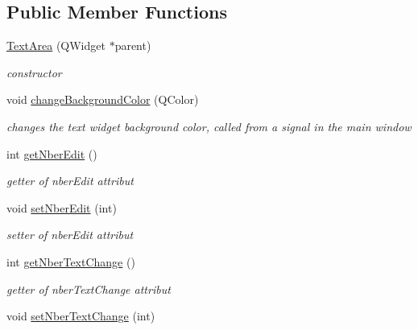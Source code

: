 \subsection*{Public Member Functions}
\begin{DoxyCompactItemize}
\item 
\hyperlink{classTextArea_a1e6e009ccaa04030d35f9187a37fe4da}{Text\+Area} (Q\+Widget $\ast$parent)
\begin{DoxyCompactList}\small\item\em constructor \end{DoxyCompactList}\item 
\hypertarget{classTextArea_acdfa220612113b805f8653dce6b7624e}{void \hyperlink{classTextArea_acdfa220612113b805f8653dce6b7624e}{change\+Background\+Color} (Q\+Color)}\label{classTextArea_acdfa220612113b805f8653dce6b7624e}

\begin{DoxyCompactList}\small\item\em changes the text widget background color, called from a signal in the main window \end{DoxyCompactList}\item 
\hypertarget{classTextArea_aee9835eedd5ed5d3b300782c653df555}{int \hyperlink{classTextArea_aee9835eedd5ed5d3b300782c653df555}{get\+Nber\+Edit} ()}\label{classTextArea_aee9835eedd5ed5d3b300782c653df555}

\begin{DoxyCompactList}\small\item\em getter of nber\+Edit attribut \end{DoxyCompactList}\item 
\hypertarget{classTextArea_a270d2c68600feb85df1ea6df7f9cf0fd}{void \hyperlink{classTextArea_a270d2c68600feb85df1ea6df7f9cf0fd}{set\+Nber\+Edit} (int)}\label{classTextArea_a270d2c68600feb85df1ea6df7f9cf0fd}

\begin{DoxyCompactList}\small\item\em setter of nber\+Edit attribut \end{DoxyCompactList}\item 
\hypertarget{classTextArea_a57737695ffd198e2c67d18b373ee56bb}{int \hyperlink{classTextArea_a57737695ffd198e2c67d18b373ee56bb}{get\+Nber\+Text\+Change} ()}\label{classTextArea_a57737695ffd198e2c67d18b373ee56bb}

\begin{DoxyCompactList}\small\item\em getter of nber\+Text\+Change attribut \end{DoxyCompactList}\item 
\hypertarget{classTextArea_ab1fb22beccd6bab80418252c04c741aa}{void \hyperlink{classTextArea_ab1fb22beccd6bab80418252c04c741aa}{set\+Nber\+Text\+Change} (int)}\label{classTextArea_ab1fb22beccd6bab80418252c04c741aa}


\end{DoxyCompactItemize}
